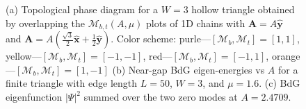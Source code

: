\documentclass[aps,prb,showpacs,amsmath,amssymb,superscriptaddress]{revtex4-2}
\let\oldhat\hat
\renewcommand{\hat}[1]{\oldhat{\mathbf{#1}}}
\begin{document}
\begin{figure}[ht]
  \hspace{28pt}
   \\
  \vspace{-20pt}
   \\
  \hspace{70pt}
  \caption{(a) Topological phase diagram for a $W=3$ hollow triangle obtained by overlapping the $\mathcal{M}_{b,t}(A, \mu)$ plots of 1D chains with $\mathbf A = A\hat{y}$ and $\mathbf A = A(\frac{\sqrt{3}}{2}\hat{x}+\frac{1}{2}\hat{y})$. Color scheme: purle---$[\mathcal{M}_b,\mathcal{M}_t]=[1,1]$, yellow---$[\mathcal{M}_b,\mathcal{M}_t]=[-1,-1]$, red---$[\mathcal{M}_b,\mathcal{M}_t]=[-1,1]$, orange---$[\mathcal{M}_b,\mathcal{M}_t]=[1,-1]$ (b) Near-gap BdG eigen-energies vs $A$ for a finite triangle with edge length $L=50$, $W=3$, and $\mu=1.6$. (c) BdG eigenfunction $|\Psi|^2$ summed over the two zero modes at $A=2.4709$.}
  \label{fig: supp pd}
\end{figure}
\end{document}
